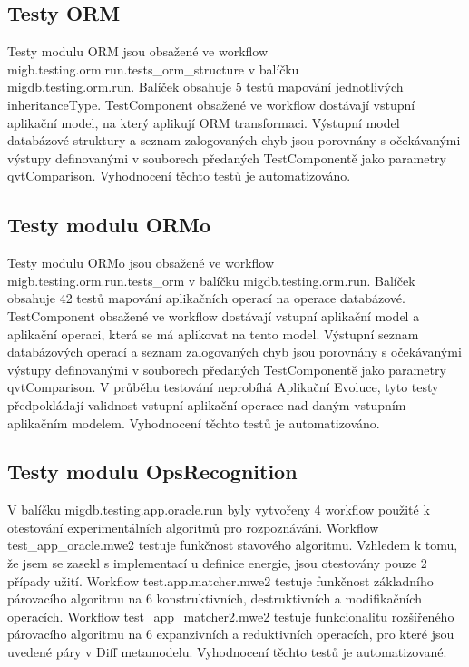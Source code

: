 \documentclass[11pt,twoside,a4paper]{book}
\begin{document}
\subsection{Testy ORM}
Testy modulu ORM jsou obsažené ve workflow
migb.testing.orm.run.tests\_orm\_structure v balíčku \\migdb.testing.orm.run.
Balíček obsahuje 5 testů mapování jednotlivých inheritanceType. TestComponent
obsažené ve workflow dostávají vstupní aplikační model, na který aplikují ORM
transformaci. Výstupní model databázové struktury a seznam zalogovaných chyb
jsou porovnány s očekávanými výstupy definovanými v souborech předaných 
TestComponentě jako parametry qvtComparison. Vyhodnocení těchto testů je automatizováno.

\subsection{Testy modulu ORMo}
Testy modulu ORMo jsou obsažené ve workflow \\migb.testing.orm.run.tests\_orm v
balíčku migdb.testing.orm.run. Balíček obsahuje 42 testů mapování aplikačních
operací na operace databázové. TestComponent obsažené ve workflow dostávají
vstupní aplikační model a aplikační operaci, která se má aplikovat na tento
model. Výstupní seznam databázových operací a seznam zalogovaných chyb jsou
porovnány s očekávanými výstupy definovanými v souborech předaných
TestComponentě jako parametry qvtComparison. V průběhu testování neprobíhá
Aplikační Evoluce, tyto testy předpokládají validnost vstupní aplikační operace
nad daným vstupním aplikačním modelem. Vyhodnocení těchto testů je
automatizováno.

\subsection{Testy modulu OpsRecognition}
V balíčku migdb.testing.app.oracle.run byly vytvořeny 4 workflow použité k
otestování experimentálních algoritmů pro rozpoznávání. Workflow
test\_app\_oracle.mwe2 testuje funkčnost stavového algoritmu. Vzhledem k tomu,
že jsem se zasekl s implementací u definice energie, jsou otestovány pouze 2
případy užití. Workflow test.app.matcher.mwe2 testuje funkčnost základního
párovacího algoritmu na 6 konstruktivních, destruktivních a modifikačních
operacích. Workflow test\_app\_matcher2.mwe2 testuje funkcionalitu rozšířeného
párovacího algoritmu na 6 expanzivních a reduktivních operacích, pro které jsou
uvedené páry v Diff metamodelu. Vyhodnocení těchto testů je automatizované.
\end{document}
